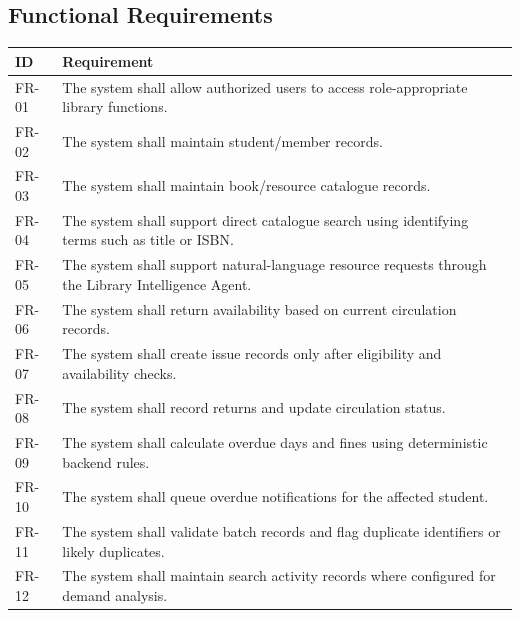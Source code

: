 \documentclass[12pt,a4paper]{report}
\begin{document}
\subsection{Functional Requirements}
\begin{longtable}{p{1.5cm}p{11.5cm}}
\toprule
\textbf{ID} & \textbf{Requirement}\\
\midrule
FR-01 & The system shall allow authorized users to access role-appropriate library functions.\\
FR-02 & The system shall maintain student/member records.\\
FR-03 & The system shall maintain book/resource catalogue records.\\
FR-04 & The system shall support direct catalogue search using identifying terms such as title or ISBN.\\
FR-05 & The system shall support natural-language resource requests through the Library Intelligence Agent.\\
FR-06 & The system shall return availability based on current circulation records.\\
FR-07 & The system shall create issue records only after eligibility and availability checks.\\
FR-08 & The system shall record returns and update circulation status.\\
FR-09 & The system shall calculate overdue days and fines using deterministic backend rules.\\
FR-10 & The system shall queue overdue notifications for the affected student.\\
FR-11 & The system shall validate batch records and flag duplicate identifiers or likely duplicates.\\
FR-12 & The system shall maintain search activity records where configured for demand analysis.\\
\bottomrule
\end{longtable}
\end{document}
